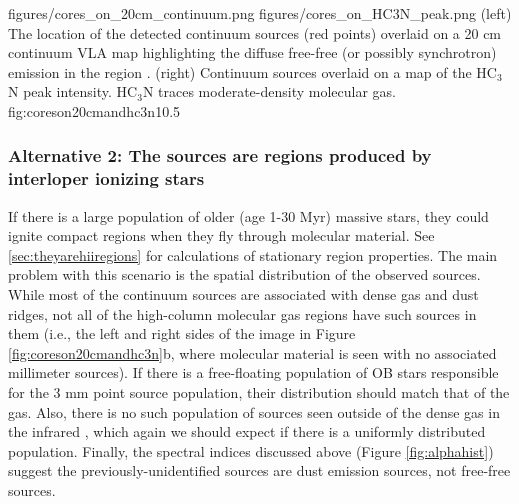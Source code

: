 \documentclass[twocolumn]{aastex61}
\begin{document}

%

\FigureTwo
{figures/cores_on_20cm_continuum.png}
{figures/cores_on_HC3N_peak.png}
{(left) The location of the detected continuum sources (red points) overlaid on a 20
cm continuum VLA map highlighting the diffuse free-free (or possibly
synchrotron) emission in the region \citep{Yusef-Zadeh2004a}.
(right) Continuum sources overlaid on a map
of the HC$_3$N peak intensity.  HC$_3$N traces moderate-density molecular gas.}
{fig:coreson20cmandhc3n}{1}{0.5\textwidth}

\subsubsection{Alternative 2: The sources are \hii regions produced by
interloper ionizing stars}
If there is a large population of older (age 1-30 Myr) massive stars, they could
ignite compact \hii regions when they fly through molecular material.  See
\ref{sec:theyarehiiregions} for calculations of stationary \hii region
properties.  The main problem with this scenario is the spatial distribution of
the observed sources.  While most of the continuum sources are associated with
dense gas and dust ridges, not all of the high-column molecular gas regions
have such sources in them (i.e., the left and right sides of the image in
Figure \ref{fig:coreson20cmandhc3n}b, where molecular material is seen with no
associated millimeter sources).  If there is a free-floating population of OB
stars responsible for the 3 mm point source population, their distribution
should match that of the gas.  Also, there is no such population of sources
seen outside of the dense gas in the infrared \citep[TODO: Who has done
infrared studies of Sgr B2?  You can infer what I have stated `by inspection'
of 2MASS, but it would be more straightforward to quote someone else][]{},
which again we should expect if there is a uniformly distributed population.  
Finally, the spectral indices discussed above (Figure \ref{fig:alphahist})
suggest the previously-unidentified sources are dust emission sources,
not free-free sources.
\end{document}
